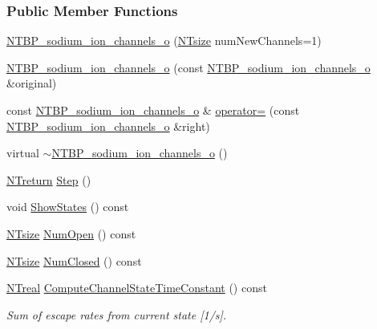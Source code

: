 \subsubsection*{Public Member Functions}
\begin{DoxyCompactItemize}
\item 
\hyperlink{class_n_t_b_p__sodium__ion__channels__o_a73f027e7c77b91321c2498506435ce80}{NTBP\_\-sodium\_\-ion\_\-channels\_\-o} (\hyperlink{nt__types_8h_a06c124f2e4469769b58230253ce0560b}{NTsize} numNewChannels=1)
\item 
\hyperlink{class_n_t_b_p__sodium__ion__channels__o_abb84701996585b13276d3d23ad8c0478}{NTBP\_\-sodium\_\-ion\_\-channels\_\-o} (const \hyperlink{class_n_t_b_p__sodium__ion__channels__o}{NTBP\_\-sodium\_\-ion\_\-channels\_\-o} \&original)
\item 
const \hyperlink{class_n_t_b_p__sodium__ion__channels__o}{NTBP\_\-sodium\_\-ion\_\-channels\_\-o} \& \hyperlink{class_n_t_b_p__sodium__ion__channels__o_affa40df74f92492551eae1148b3745f4}{operator=} (const \hyperlink{class_n_t_b_p__sodium__ion__channels__o}{NTBP\_\-sodium\_\-ion\_\-channels\_\-o} \&right)
\item 
virtual \hyperlink{class_n_t_b_p__sodium__ion__channels__o_aef797f01f2b9792e55b686dfe4387965}{$\sim$NTBP\_\-sodium\_\-ion\_\-channels\_\-o} ()
\item 
\hyperlink{nt__types_8h_ab9564ee8f091e809d21b8451c6683c53}{NTreturn} \hyperlink{class_n_t_b_p__sodium__ion__channels__o_aa90addc3f071c162a43a43e758b4df81}{Step} ()
\item 
void \hyperlink{class_n_t_b_p__sodium__ion__channels__o_a8980fe2ed37fb8dc8f58afd841b7799c}{ShowStates} () const 
\item 
\hyperlink{nt__types_8h_a06c124f2e4469769b58230253ce0560b}{NTsize} \hyperlink{class_n_t_b_p__sodium__ion__channels__o_a16bede0246bf016d77070519f769333b}{NumOpen} () const 
\item 
\hyperlink{nt__types_8h_a06c124f2e4469769b58230253ce0560b}{NTsize} \hyperlink{class_n_t_b_p__sodium__ion__channels__o_a9fe662d5dffde34f80fe972383f844fe}{NumClosed} () const 
\item 
\hyperlink{nt__types_8h_a814a97893e9deb1eedcc7604529ba80d}{NTreal} \hyperlink{class_n_t_b_p__sodium__ion__channels__o_abd74db620cecb51853a5c9a8cfbf3676}{ComputeChannelStateTimeConstant} () const 
\begin{DoxyCompactList}\small\item\em Sum of escape rates from current state \mbox{[}1/s\mbox{]}. \item\end{DoxyCompactList}\item 

\end{DoxyCompactItemize}
